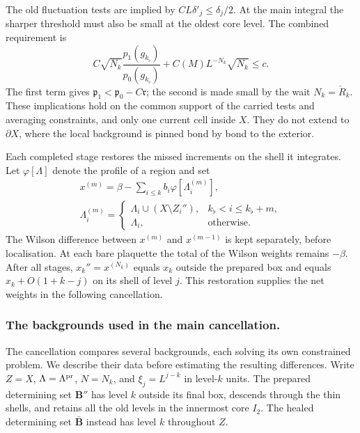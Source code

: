 \documentclass[11pt,letterpaper,reqno]{amsart}
\theoremstyle{definition}
\theoremstyle{remark}
\begin{document}
The old fluctuation tests are
implied by
$CL\delta'_j\le\delta_j/2$.
At the main integral the sharper
threshold must also be small at
the oldest core level. The
combined requirement is
\begin{equation}\label{eq:xrg-stage-threshold-room}
 C\sqrt{N_k}\frac{p_1(g_{k_\flat})}{p_0(g_{k_\flat})}
       +C(M)L^{-N_k}\sqrt{N_k}\le c.
\end{equation}
The first term gives
$\mathfrak p_1<\mathfrak p_0-C\mathfrak r$;
the second is made small by
the wait $N_k=\check R_k$.
These implications hold on the
common support of the carried
tests and averaging constraints,
and only one current cell
inside $X$. They do not extend
to $\partial X$, where the
local background is pinned
bond by bond to the exterior.

Each completed stage restores
the missed increments on the
shell it integrates. Let
$\varphi[\Lambda]$ denote the
profile of a region and set
\begin{equation}\label{eq:xrg-stage-weights}
 \begin{gathered}
 x^{(m)}=\beta-\sum_{i\le k}b_i\varphi[\Lambda_i^{(m)}],\\
 \Lambda_i^{(m)}=
 \begin{cases}
 \Lambda_i\cup(X\setminus Z_i''),&k_\flat<i\le k_\flat+m,\\
 \Lambda_i,&\text{otherwise}.
 \end{cases}
 \end{gathered}
\end{equation}
The Wilson difference between
$x^{(m)}$ and $x^{(m-1)}$ is
kept separately, before
localisation. At each bare
plaquette the total of the
Wilson weights remains
$-\beta$. After all stages,
$x_k''=x^{(N_k)}$ equals $x_k$
outside the prepared box and
equals $x_k+O(1+k-j)$ on its
shell of level $j$.
This restoration supplies the
net weights in the following
cancellation.

\subsubsection*{The backgrounds used in the main cancellation.}

The cancellation compares several backgrounds, each solving its
own constrained problem. We describe their data before estimating
the resulting differences. Write \(Z=X\), \(\Lambda=\Lambda^{\rm pr}\),
\(N=N_k\), and \(\xi_j=L^{j-k}\) in level-\(k\) units.
The prepared determining set \(\mathbf B''\) has level \(k\)
outside its final box, descends through the thin shells, and
retains all the old levels in the innermost core \(I_2\).
The healed determining set \(\bar{\mathbf B}\) instead has
level \(k\) throughout \(Z\).
\end{document}
